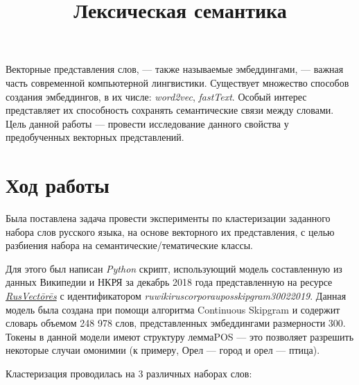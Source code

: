 \documentclass[12pt, a4paper]{article}
\title{Лексическая семантика}
\begin{document}
	\maketitle

	\tableofcontents
	
	\begin{introduction}
		Векторные представления слов, --- также называемые эмбеддингами, --- важная часть современной компьютерной лингвистики. Существует множество способов создания эмбеддингов, в их числе: \textit{word2vec}, \textit{fastText}. Особый интерес представляет их способность сохранять семантические связи между словами. Цель данной работы --- провести исследование данного свойства у предобученных векторных представлений.
	\end{introduction}
	
	\section{Ход работы}
	
	Была поставлена задача провести эксперименты по кластеризации заданного набора слов русского языка, на основе векторного их представления, с целью разбиения набора на семантические/тематические классы.

    Для этого был написан \textit{Python} скрипт, использующий модель составленную из данных Википедии и НКРЯ за декабрь 2018 года представленную на ресурсе \textit{\href{https://rusvectores.org/ru/}{RusVectōrēs}} с идентификатором \textit{ruwikiruscorpora\textunderscore{}upos\textunderscore{}skipgram\textunderscore{}300\textunderscore{}2\textunderscore{}2019}. Данная модель была создана при помощи алгоритма Continuous Skipgram и содержит словарь объемом 248 978 слов, представленных эмбеддингами размерности 300. Токены в данной модели имеют структуру лемма\textunderscore{}POS --- это позволяет разрешить некоторые случаи омонимии (к примеру, Орел --- город и орел --- птица).

    Кластеризация проводилась на 3 различных наборах слов:
    
\end{document}
